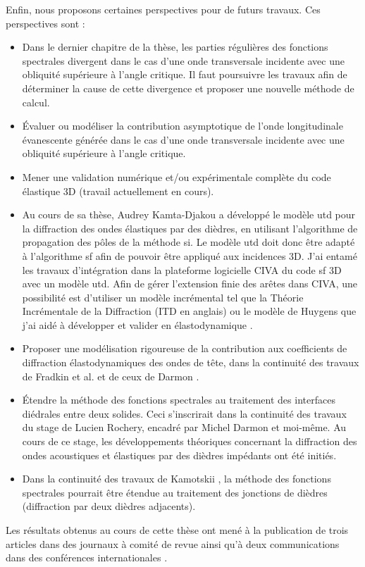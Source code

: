 Enfin, nous proposons certaines perspectives pour de futurs travaux. Ces perspectives sont :
\begin{itemize}
\item Dans le dernier chapitre de la thèse, les parties régulières des fonctions spectrales divergent dans le cas d'une onde transversale incidente avec une obliquité supérieure à l'angle critique. Il faut poursuivre les travaux afin de déterminer la cause de cette divergence et proposer une nouvelle méthode de calcul.
\item Évaluer ou modéliser la contribution asymptotique de l'onde longitudinale évanescente générée dans le cas d'une onde transversale incidente avec une obliquité supérieure à l'angle critique.
\item Mener une validation numérique et/ou expérimentale complète du code élastique 3D (travail actuellement en cours).
\item Au cours de sa thèse, Audrey Kamta-Djakou \cite{AKDthese} a développé le modèle \acrshort{utd} pour la diffraction des ondes élastiques par des dièdres, en utilisant l'algorithme de propagation des pôles de la méthode \acrshort{si}. Le modèle \acrshort{utd} doit donc être adapté à
l'algorithme \acrshort{sf} afin de pouvoir être appliqué aux incidences 3D. J'ai entamé les travaux d'intégration dans la plateforme logicielle CIVA du code \acrshort{sf} 3D avec un modèle \acrshort{utd}. Afin de gérer l'extension finie des arêtes dans CIVA, une possibilité est d'utiliser un modèle incrémental tel que la Théorie Incrémentale de la Diffraction (ITD en anglais) ou le modèle de Huygens que j'ai aidé à développer et valider en élastodynamique \cite{articleITD}.
\item Proposer une modélisation rigoureuse de la contribution aux coefficients de diffraction élastodynamiques des ondes de tête, dans la continuité des travaux de Fradkin et al. \cite{FradkinDarmon} et de ceux de Darmon \cite{HDRMichel}.
\item Étendre la méthode des fonctions spectrales au traitement des interfaces diédrales entre deux solides. Ceci s'inscrirait dans la continuité des travaux du stage de Lucien Rochery, encadré par Michel Darmon et moi-même. Au cours de ce stage, les développements théoriques concernant la diffraction des ondes acoustiques et élastiques par des dièdres impédants ont été initiés.
\item Dans la continuité des travaux de Kamotskii \cite{Kamotski2}, la méthode des fonctions spectrales pourrait être étendue au traitement des jonctions de dièdres (diffraction par deux dièdres adjacents).
\end{itemize}


Les résultats obtenus au cours de cette thèse ont mené à la publication de trois articles dans des journaux à comité de revue \cite{articleITD,article,articleelasto} ainsi qu'à deux communications dans des conférences internationales \cite{DD2018,AFPAC}.
